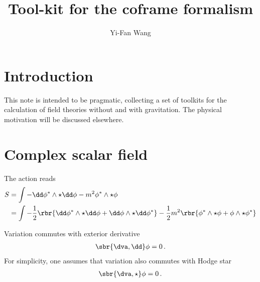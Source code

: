 \documentclass[a4paper]{article}
\title{Tool-kit for the coframe formalism}
\author{Yi-Fan Wang}
\begin{document}
\maketitle


\tableofcontents

\section{Introduction}


This note is intended to be pragmatic, collecting a set of toolkits for the 
calculation of field theories without and with gravitation. The physical 
motivation will be discussed elsewhere.

\section{Complex scalar field}


The action reads
\begin{align}
S &= \int -\dd\phi^*\wedge\star\dd\phi - m^2 \phi^*\wedge\star\phi
\\
&= \int -\frac{1}{2}\rbr{\dd\phi^*\wedge\star\dd\phi 
		+ \dd\phi\wedge\star\dd\phi^*}
		- \frac{1}{2} m^2 \rbr{\phi^*\wedge\star\phi
		+ \phi\wedge\star\phi^*}
\end{align}

Variation commutes with exterior derivative
\begin{align}
\sbr{\dva, \dd}\phi = 0\,.
\label{eq:dva-commu-dd-10}
\end{align}
For simplicity, one assumes that variation also commutes with Hodge star
\begin{align}
\sbr{\dva, \star}\phi = 0\,.
\label{eq:dva-commu-star-10}
\end{align}
\end{document}
